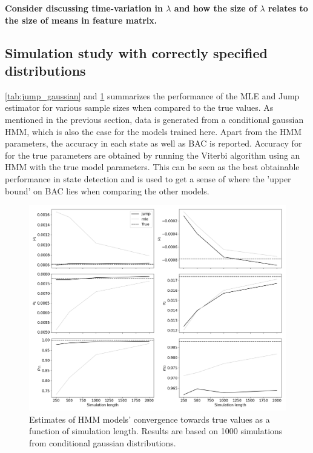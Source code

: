 \textbf{Consider discussing time-variation in $\lambda$ and how the size of $\lambda$ relates to the size of means in feature matrix.}

\subsection{Simulation study with correctly specified distributions}

\cref{tab:jump_gaussian} and \cref{fig:jump_normal} summarizes the performance of the MLE and Jump estimator for various sample sizes when compared to the true values. As mentioned in the previous section, data is generated from a conditional gaussian HMM, which is also the case for the models trained here. Apart from the HMM parameters, the accuracy in each state as well as BAC is reported. Accuracy for for the true parameters are obtained by running the Viterbi algorithm using an HMM with the true model parameters. This can be seen as the best obtainable performance in state detection and is used to get a sense of where the 'upper bound' on BAC lies when comparing the other models.

\begin{figure}[H] 
    \centering
    \includegraphics[width=1\textwidth]{analysis/model_convergence/images/simulation_normal.png}
    \caption{Estimates of HMM models' convergence towards true values as a function of simulation length. Results are based on 1000 simulations from conditional gaussian distributions.}
    \label{fig:jump_normal}
\end{figure}

